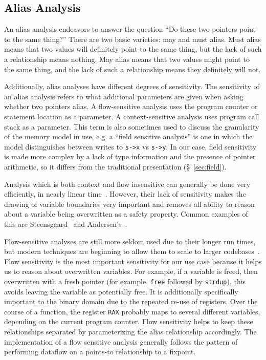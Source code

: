\subsection{Alias Analysis}
An alias analysis endeavors to answer the question ``Do these two pointers point to the same thing?''
There are two basic varieties: may and must alias.
Must alias means that two values will definitely point to the same thing, but the lack of such a relationship means nothing.
May alias means that two values might point to the same thing, and the lack of such a relationship means they definitely will not.

Additionally, alias analyses have different degrees of sensitivity.
The sensitivity of an alias analysis refers to what additional parameters are given when asking whether two pointers alias.
A flow-sensitive analysis uses the program counter or statement location as a parameter.
A context-sensitive analysis uses program call stack as a parameter.
This term is also sometimes used to discuss the granularity of the memory model in use, e.g. a ``field sensitive analysis'' is one in which the model distinguishes between writes to \texttt{s->x} vs \texttt{s->y}.
In our case, field sensitivity is made more complex by a lack of type information and the presence of pointer arithmetic, so it differs from the traditional presentation (\S~\ref{sec:field}).

Analysis which is both context and flow insensitive can generally be done very efficiently, in nearly linear time~\cite{steensgaard-alias}.
However, their lack of sensitivity makes the drawing of variable boundaries very important and removes all ability to reason about a variable being overwritten as a safety property.
Common examples of this are Steensgaard~\cite{steensgaard-alias} and Andersen's~\cite{andersen-alias}.

Flow-sensitive analyses are still more seldom used due to their longer run times, but modern techniques are beginning to allow them to scale to larger codebases~\cite{sfs}.
Flow sensitivity is the most important sensitivity for our use case because it helps us to reason about overwritten variables.
For example, if a variable is freed, then overwritten with a fresh pointer (for example, \texttt{free} followed by \texttt{strdup}), this avoids leaving the variable as potentially free.
It is additionally specifically important to the binary domain due to the repeated re-use of registers.
Over the course of a function, the register \texttt{RAX} probably maps to several different variables, depending on the current program counter.
Flow sensitivity helps to keep these relationships separated by parameterizing the alias relationship accordingly.
The implementation of a flow sensitive analysis generally follows the pattern of performing dataflow on a points-to relationship to a fixpoint.

